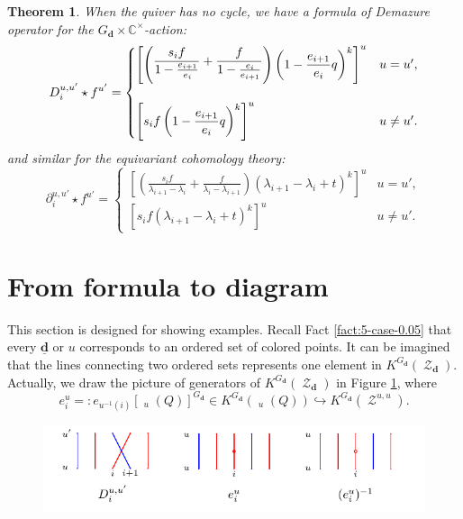 \documentclass[reqno,11pt]{book}
\numberwithin{equation}{section}
\theoremstyle{plain}
\newtheorem{theorem}{Theorem}[section]
\theoremstyle{plain}
\numberwithin{equation}{section}
\theoremstyle{remark}
\DeclareMathOperator{\RRep}{\widetilde{\operatorname{Rep}}}
\DeclareMathOperator{\St}{\mathcal{Z}}
\newcommand{\dimvec}[1]{\mathbf{#1}}
\newcommand{\ftdimvec}[1]{\underline{\dimvec{#1}}}
\begin{document}
\begin{theorem}\label{thm:Demazure_operator_2}
When the quiver has no cycle, we have a formula of Demazure operator for the $G_{\dimvec{d}} \times \mathbb{C}^{\times}$-action:
\begin{equation*}\label{eq:Demazure_operator_C*action}
D_i^{u,u'} \star f^{u'}=\begin{cases}
\left[\left( \raisebox{1mm}{$\displaystyle\frac{s_i f}{ 1-\frac{e_{i+1}}{e_{i}}}     + \frac{f}{1-\frac{e_{i}}{e_{i+1}}}$}  \right)\left(\displaystyle 1-\frac{e_{i+1}}{e_{i}} q\right)^{k} \right]^{u} & u=u',\\[8mm]
\left[s_i f  \left(\displaystyle 1-\frac{e_{i+1}}{e_{i}} q\right)^{k} \right]^{u} & u \neq u'.
\end{cases}
\end{equation*}
and similar for the equivariant cohomology theory:
\begin{equation*}\label{eq:Demazure_operator_cth_C*action}
\partial_i^{u,u'} \star f^{u'}=\begin{cases}
\left[\left( \displaystyle\frac{s_i f}{ \lambda_{i+1}-\lambda_{i}}     + \frac{f}{\lambda_{i}-\lambda_{i+1} }  \right)\left(\lambda_{i+1}-\lambda_{i} +t \right)^{k} \right]^{u} & u=u',\\[8mm]
\left[s_i f  \left(\lambda_{i+1}-\lambda_{i} +t\right)^{k} \right]^{u} & u \neq u'.
\end{cases}
\end{equation*}
\end{theorem}
\section{From formula to diagram}\label{sec:diagram}
This section is designed for showing examples. Recall Fact \ref{fact:5-case-0.05} that every $\ftdimvec{d}$ or $u$ corresponds to an ordered set of colored points. It can be imagined that the lines connecting two ordered sets represents one element in $K^{G_{\dimvec{d}}}(\St_{\dimvec{d}})$. Actually, we draw the picture of generators of $K^{G_{\dimvec{d}}}(\St_{\dimvec{d}})$ in Figure \ref{fig:generators}, where
$$e_{i}^{u}=:e_{u^{-1}(i)} \left[ \RRep_{u}(Q) \right]^{G_{\dimvec{d}}} \in K^{G_{\dimvec{d}}} \left( \RRep_{u}(Q) \right) \hookrightarrow K^{G_{\dimvec{d}}} \left( \St^{u,u} \right).$$

\begin{figure}[ht]
  \vspace{0cm}
    \centering  \includegraphics[width=12cm]{figures/strands/generators.pdf}
      \caption{}
      \label{fig:generators}        
\end{figure}
\end{document}
